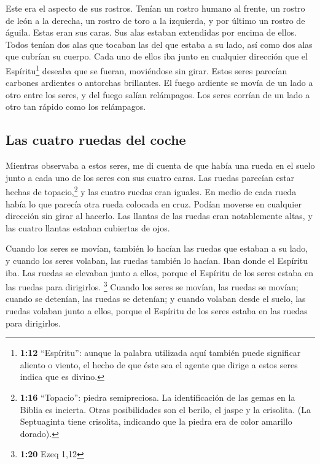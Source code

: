  Este era el aspecto de sus rostros. Tenían un rostro
humano al frente, un rostro de león a la derecha, un rostro de toro a la
izquierda, y por último un rostro de águila.  Estas eran
sus caras. Sus alas estaban extendidas por encima de ellos. Todos tenían
dos alas que tocaban las del que estaba a su lado, así como dos alas que
cubrían su cuerpo.  Cada uno de ellos iba junto en
cualquier dirección que el Espíritu\footnote{\textbf{1:12} ``Espíritu'':
  aunque la palabra utilizada aquí también puede significar aliento o
  viento, el hecho de que éste sea el agente que dirige a estos seres
  indica que es divino.} deseaba que se fueran, moviéndose sin girar.
 Estos seres parecían carbones ardientes o antorchas
brillantes. El fuego ardiente se movía de un lado a otro entre los
seres, y del fuego salían relámpagos.  Los seres corrían
de un lado a otro tan rápido como los relámpagos.

\hypertarget{las-cuatro-ruedas-del-coche}{%
\subsection{Las cuatro ruedas del
coche}\label{las-cuatro-ruedas-del-coche}}

 Mientras observaba a estos seres, me di cuenta de que
había una rueda en el suelo junto a cada uno de los seres con sus cuatro
caras.  Las ruedas parecían estar hechas de
topacio,\footnote{\textbf{1:16} ``Topacio'': piedra semipreciosa. La
  identificación de las gemas en la Biblia es incierta. Otras
  posibilidades son el berilo, el jaspe y la crisolita. (La Septuaginta
  tiene crisolita, indicando que la piedra era de color amarillo
  dorado).} y las cuatro ruedas eran iguales. En medio de cada rueda
había lo que parecía otra rueda colocada en cruz.  Podían
moverse en cualquier dirección sin girar al hacerlo.  Las
llantas de las ruedas eran notablemente altas, y las cuatro llantas
estaban cubiertas de ojos.

 Cuando los seres se movían, también lo hacían las ruedas
que estaban a su lado, y cuando los seres volaban, las ruedas también lo
hacían.  Iban donde el Espíritu iba. Las ruedas se
elevaban junto a ellos, porque el Espíritu de los seres estaba en las
ruedas para dirigirlos. \footnote{\textbf{1:20} Ezeq 1,12}
 Cuando los seres se movían, las ruedas se movían; cuando
se detenían, las ruedas se detenían; y cuando volaban desde el suelo,
las ruedas volaban junto a ellos, porque el Espíritu de los seres estaba
en las ruedas para dirigirlos.

